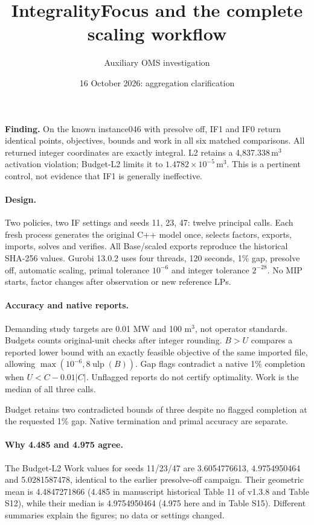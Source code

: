 \documentclass[10pt,a4paper]{article}
\begin{document}
\title{IntegralityFocus and the complete scaling workflow}
\author{Auxiliary OMS investigation}\date{16 October 2026: aggregation clarification}\maketitle
\noindent\textbf{Finding.} On the known instance046 with presolve off, IF1 and IF0
return identical points, objectives, bounds and work in all six matched comparisons.
All returned integer coordinates are exactly integral. L2 retains a 4,837.338\,m$^3$
activation violation; Budget-L2 limits it to $1.4782\times10^{-5}$\,m$^3$. This is
a pertinent control, not evidence that IF1 is generally ineffective.

\paragraph{Design.} Two policies, two IF settings and seeds 11, 23, 47: twelve
principal calls. Each fresh process generates the original C++ model once, selects
factors, exports, imports, solves and verifies. All Base/scaled exports reproduce
the historical SHA-256 values. Gurobi 13.0.2 uses four threads, 120 seconds, 1\% gap,
presolve off, automatic scaling, primal tolerance $10^{-6}$ and integer tolerance
$2^{-28}$. No MIP starts, factor changes after observation or new reference LPs.

\paragraph{Accuracy and native reports.} Demanding study targets are 0.01 MW and
100 m$^3$, not operator standards. Budgets counts original-unit checks after integer
rounding. $B>U$ compares a reported lower bound with an exactly feasible objective
of the same imported file, allowing $\max(10^{-6},8\operatorname{ulp}(B))$.
Gap flags contradict a native 1\% completion when $U<C-0.01|C|$.
Unflagged reports do not certify optimality. Work is the median of all three calls.
\begin{center}\small

\end{center}
Budget retains two contradicted bounds of three despite no flagged completion
at the requested 1\% gap. Native termination and primal accuracy are separate.

\paragraph{Why 4.485 and 4.975 agree.} The Budget-L2 Work values for seeds 11/23/47
are 3.6054776613, 4.9754950464 and 5.0281587478, identical to the earlier
presolve-off campaign. Their geometric mean is 4.4847271866 (4.485 in manuscript
historical Table 11 of v1.3.8 and Table S12), while their median is 4.9754950464 (4.975 here and in
Table S15). Different summaries explain the figures; no data or settings changed.
\end{document}

